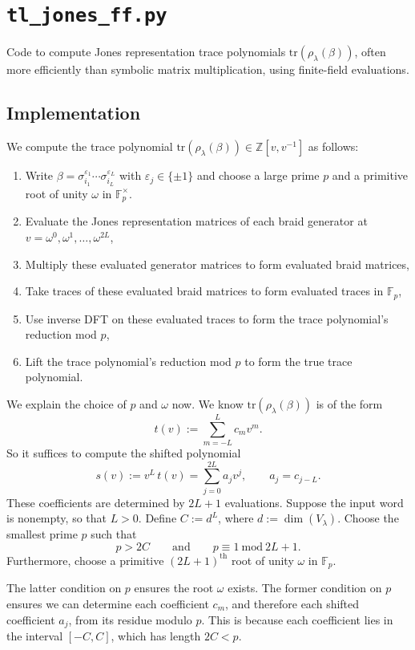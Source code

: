 \documentclass[10pt]{article}
\title{}
\author{}
\date{}
\begin{document}
\section*{\texttt{tl\_jones\_ff.py}}
Code to compute Jones representation trace polynomials $\mathrm{tr}(\rho_\lambda(\beta))$, often more efficiently than symbolic matrix multiplication, using finite-field evaluations. 

\subsection*{Implementation}
We compute the trace polynomial $\mathrm{tr}(\rho_\lambda(\beta))\in\mathbb{Z}[v,v^{-1}]$ as follows:
\begin{enumerate}
\item Write $\beta=\sigma_{i_1}^{\varepsilon_1}\cdots\sigma_{i_L}^{\varepsilon_L}$ with $\varepsilon_j \in\{\pm1\}$ and choose a large prime $p$ and a primitive root of unity $\omega$ in $\mathbb{F}_p^\times$. 
\item Evaluate the Jones representation matrices of each braid generator at $v=\omega^0,\omega^1,\ldots,\omega^{2L}$,
\item Multiply these evaluated generator matrices to form evaluated braid matrices,
\item Take traces of these evaluated braid matrices to form evaluated traces in $\mathbb{F}_p$,
\item Use inverse DFT on these evaluated traces to form the trace polynomial's reduction mod $p$,
\item Lift the trace polynomial's reduction mod $p$ to form the true trace polynomial. 
\end{enumerate}

We explain the choice of $p$ and $\omega$ now. We know $\mathrm{tr}(\rho_\lambda(\beta))$ is of the form
\[
t(v):=\sum_{m=-L}^{L} c_m v^m.
\]
So it suffices to compute the shifted polynomial
\[
s(v):=v^L\, t(v) = \sum_{j=0}^{2L} a_j v^j,
\qquad a_j=c_{j-L}.
\]
These coefficients are determined by \(2L+1\) evaluations. Suppose the input word is nonempty, so that $L>0$. Define $C := d^L$, where $d:= \dim(V_\lambda)$. Choose the smallest prime \(p\) such that 
\[
p>2C
\qquad
\text{and}
\qquad
p\equiv 1\ \text{mod}\ {2L+1}.
\]
Furthermore, choose a primitive $(2L+1)^\text{th}$ root of unity $\omega$ in $\mathbb{F}_p$. 

The latter condition on $p$ ensures the root $\omega$ exists. The former condition on $p$ ensures we can determine each coefficient $c_m$, and therefore each shifted coefficient $a_j$, from its residue modulo $p$. This is because each coefficient lies in the interval $[-C,C]$, which has length $2C<p$.
\end{document}
